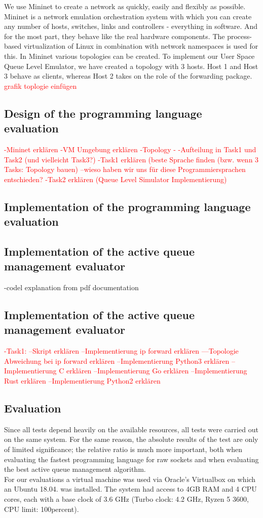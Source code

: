 We use Mininet to create a network as quickly, easily and flexibly as possible. Mininet is a network emulation orchestration system with which you can create any number of hosts, switches, links and controllers - everything in software. And for the most part, they behave like the real hardware components. The process-based virtualization of Linux in combination with network namespaces is used for this. \newline
In Mininet various topologies can be created. To implement our User Space Queue Level Emulator, we have created a topology with 3 hosts. Host 1 and Host 3 behave as clients, whereas Host 2 takes on the role of the forwarding package. 
\textcolor{red}{grafik toplogie einfügen}
\subsection{Design of the programming language evaluation}
\textcolor{red}{-Mininet erklären
-VM Umgebung erklären
-Topology
-
-Aufteilung in Task1 und Task2 (und vielleicht Task3?)
-Task1 erklären (beste Sprache finden (bzw. wenn 3 Tasks: Topology bauen)
--wieso haben wir uns für diese Programmiersprachen entschieden?
-Task2 erklären (Queue Level Simulator Implementierung)}

\subsection{Implementation of the programming language evaluation}

\subsection{Implementation of the active queue management evaluator}
-codel explanation from pdf documentation
\subsection{Implementation of the active queue management evaluator}

\textcolor{red}{-Task1:
--Skript erklären
--Implementierung ip forward erklären
---Topologie Abweichung bei ip forward erklären
--Implementierung Python3 erklären
--Implementierung C erklären
--Implementierung Go erklären
--Implementierung Rust erklären
--Implementierung Python2 erklären}

\subsection{Evaluation}
Since all tests depend heavily on the available resources, all tests were carried out on the same system. For the same reason, the absolute results of the test are only of limited significance; the relative ratio is much more important, both when evaluating the fastest programming language for raw sockets and when evaluating the best active queue management algorithm.\\
For our evaluations a virtual machine was used via Oracle's Virtualbox on which an Ubuntu 18.04. was installed. The system had access to 4GB RAM and 4 CPU cores, each with a base clock of 3.6 GHz (Turbo clock: 4.2 GHz, Ryzen 5 3600, CPU limit: 100percent).\\
